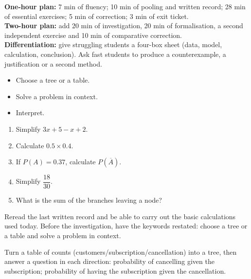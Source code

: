     \ifprof
    \begin{methode}
    \textbf{One-hour plan:} 7 min of fluency; 10 min of pooling and written record; 28 min of essential exercises; 5 min of correction; 3 min of exit ticket.\\
    \textbf{Two-hour plan:} add 20 min of investigation, 20 min of formalisation, a second independent exercise and 10 min of comparative correction.\\
    \textbf{Differentiation:} give struggling students a four-box sheet (data, model, calculation, conclusion). Ask fast students to produce a counterexample, a justification or a second method.
    \end{methode}
    \fi
{}
\begin{objectifs}\begin{itemize}\item Choose a tree or a table.\item Solve a problem in context.\item Interpret.\end{itemize}\end{objectifs}
\begin{automatismes}\begin{enumerate}\item Simplify $3x+5-x+2$. \item Calculate $0.5\times0.4$. \item If $P(A)=0.37$, calculate $P(\overline A)$. \item Simplify $\dfrac{18}{30}$. \item What is the sum of the branches leaving a node? \end{enumerate}\end{automatismes}
\begin{prerequis}Reread the last written record and be able to carry out the basic calculations used today. Before the investigation, have the keywords restated: choose a tree or a table and solve a problem in context.\end{prerequis}

\begin{activite}
Turn a table of counts (customers/subscription/cancellation) into a tree, then answer a question in each direction: probability of cancelling given the subscription; probability of having the subscription given the cancellation.

\end{activite}

